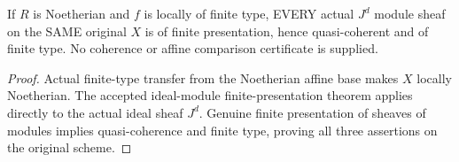 \begin{lemma}
\label{lem:fibre-ideal-power-coherence}
\leanok
{}
If $R$ is Noetherian and $f$ is locally of finite type, EVERY actual
$J^d$ module sheaf on the SAME original $X$ is of finite presentation,
hence quasi-coherent and of finite type. No coherence or affine
comparison certificate is supplied.
\end{lemma}
\begin{proof}
Actual finite-type transfer from the Noetherian affine base makes $X$
locally Noetherian. The accepted ideal-module finite-presentation theorem
applies directly to the actual ideal sheaf $J^d$. Genuine finite
presentation of sheaves of modules implies quasi-coherence and finite
type, proving all three assertions on the original scheme.
\end{proof}
